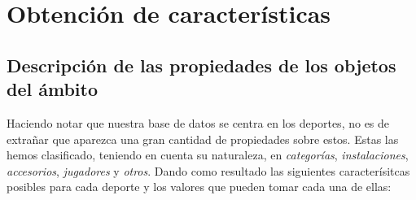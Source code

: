 \chapter{Obtención de características}

\section{Descripción de las propiedades de los objetos del ámbito}

Haciendo notar que nuestra base de datos se centra en los deportes, no es de extrañar que aparezca una gran cantidad de propiedades sobre estos. Estas las hemos clasificado, teniendo en cuenta su naturaleza, en \emph{categorías}, \emph{instalaciones}, \emph{accesorios}, \emph{jugadores} y \emph{otros}. Dando como resultado las siguientes caracterísitcas posibles para cada deporte y los valores que pueden tomar cada una de ellas: 

